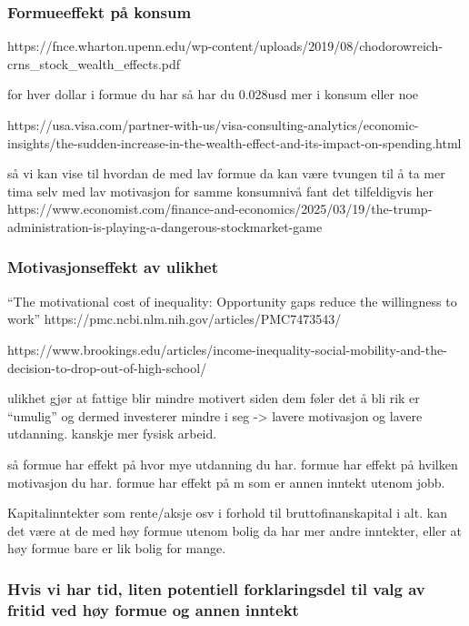 \documentclass[
  12pt,
  a4paper,
  DIV=11,
  numbers=noendperiod]{scrartcl}
\begin{document}
\subsubsection{Formueeffekt på konsum}\label{formueeffekt-puxe5-konsum}

https://fnce.wharton.upenn.edu/wp-content/uploads/2019/08/chodorowreich-crns\_stock\_wealth\_effects.pdf

for hver dollar i formue du har så har du 0.028usd mer i konsum eller
noe

https://usa.visa.com/partner-with-us/visa-consulting-analytics/economic-insights/the-sudden-increase-in-the-wealth-effect-and-its-impact-on-spending.html

så vi kan vise til hvordan de med lav formue da kan være tvungen til å
ta mer tima selv med lav motivasjon for samme konsumnivå fant det
tilfeldigvis her
https://www.economist.com/finance-and-economics/2025/03/19/the-trump-administration-is-playing-a-dangerous-stockmarket-game

\subsubsection{Motivasjonseffekt av
ulikhet}\label{motivasjonseffekt-av-ulikhet}

``The motivational cost of inequality: Opportunity gaps reduce the
willingness to work'' https://pmc.ncbi.nlm.nih.gov/articles/PMC7473543/

https://www.brookings.edu/articles/income-inequality-social-mobility-and-the-decision-to-drop-out-of-high-school/

ulikhet gjør at fattige blir mindre motivert siden dem føler det å bli
rik er ``umulig'' og dermed investerer mindre i seg -\textgreater{}
lavere motivasjon og lavere utdanning. kanskje mer fysisk arbeid.

så formue har effekt på hvor mye utdanning du har. formue har effekt på
hvilken motivasjon du har. formue har effekt på m som er annen inntekt
utenom jobb.

Kapitalinntekter som rente/aksje osv i forhold til bruttofinanskapital i
alt. kan det være at de med høy formue utenom bolig da har mer andre
inntekter, eller at høy formue bare er lik bolig for mange.

\subsubsection{Hvis vi har tid, liten potentiell forklaringsdel til valg
av fritid ved høy formue og annen
inntekt}\label{hvis-vi-har-tid-liten-potentiell-forklaringsdel-til-valg-av-fritid-ved-huxf8y-formue-og-annen-inntekt}
\end{document}
